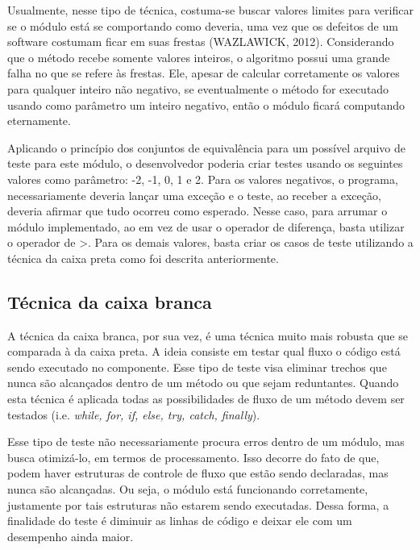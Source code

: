 \documentclass[
    12pt,       %
    openright,      %
    twoside,      %
    a4paper,      %
    english,      %
    french,       %
    spanish,      %
    brazil,       %
    ]{abntex2}
\begin{document}
              Usualmente, nesse tipo de técnica, costuma-se buscar valores limites para verificar
              se o módulo está se comportando como deveria, uma vez que os defeitos de um software
              costumam ficar em suas frestas (WAZLAWICK, 2012). Considerando que o método recebe somente
              valores inteiros, o algoritmo possui uma grande falha no que se refere às frestas. Ele,
              apesar de calcular corretamente os valores para qualquer inteiro não negativo, se
              eventualmente o método for executado usando como parâmetro um inteiro negativo, então o
              módulo ficará computando eternamente.

              Aplicando o princípio dos conjuntos de equivalência para um possível arquivo de teste
              para este módulo, o desenvolvedor poderia criar testes usando os seguintes valores como
              parâmetro: -2, -1, 0, 1 e 2. Para os valores negativos, o programa, necessariamente deveria
              lançar uma exceção e o teste, ao receber a exceção, deveria afirmar que tudo ocorreu como
              esperado. Nesse caso, para arrumar o módulo implementado, ao em vez de usar o
              operador de diferença, basta utilizar o operador de >. Para os demais valores, basta criar
              os casos de teste utilizando a técnica da caixa preta como foi descrita anteriormente.

          \subsection{Técnica da caixa branca}
              A técnica da caixa branca, por sua vez, é uma técnica muito mais robusta que se comparada
              à da caixa preta. A ideia consiste em testar qual fluxo o código está sendo executado no
              componente. Esse tipo de teste visa eliminar trechos que nunca
              são alcançados dentro de um método ou que sejam reduntantes. Quando esta técnica é
              aplicada todas as possibilidades de fluxo de um método devem ser testados
              (i.e. \textit{while, for, if, else, try, catch, finally}).

              Esse tipo de teste não necessariamente procura erros dentro de um módulo, mas busca
              otimizá-lo, em termos de processamento. Isso decorre do fato de que, podem haver
              estruturas de controle de fluxo que estão sendo declaradas, mas nunca são alcançadas.
              Ou seja, o módulo está funcionando corretamente, justamente por tais estruturas não
              estarem sendo executadas. Dessa forma, a finalidade do teste é diminuir as linhas de código
              e deixar ele com um desempenho ainda maior.
\end{document}
